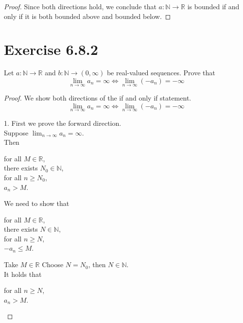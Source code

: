 \documentclass{article}
\newcommand{\N}{\mathbb{N}}
\newcommand{\R}{\mathbb{R}}
\theoremstyle{mytheoremstyle}
\theoremstyle{mytheoremstyle}
\theoremstyle{myproblemstyle}
\begin{document}
\begin{proof}
        Since both directions hold, we conclude that $a: \N \to \R$ is bounded if and only if it is both bounded above and bounded below.
    \end{proof}

    \section{Exercise 6.8.2}
    \begin{problem}
        Let $a: \N \to \R$ and $b: \N \to (0,\infty)$ be real-valued sequences. Prove that
        $$\lim_{n\to\infty}a_n = \infty \iff \lim_{n\to\infty}(-a_n) = -\infty$$
    \end{problem}
    \begin{proof}
        We show both directions of the if and only if statement.
        $$\lim_{n\to\infty}a_n = \infty \iff \lim_{n\to\infty}(-a_n) = -\infty$$

        1. First we prove the forward direction. \\
        Suppose $\lim_{n\to\infty}a_n = \infty$. \\
        Then
        \begin{center}
            \parbox{\linewidth}{
                \linewidth
                for all $M \in \R$, \\
                \hspace*{1em} there exists $N_0 \in \N$, \\
                \hspace*{2em} for all $n \geq N_0$, \\
                \hspace*{3em} $a_n > M$.
            }
        \end{center}
        We need to show that
        \begin{center}
            \parbox{\linewidth}{
                \linewidth
                for all $M \in \R$, \\
                \hspace*{1em} there exists $N \in \N$, \\
                \hspace*{2em} for all $n \geq N$, \\
                \hspace*{3em} $-a_n \leq M$.
            }
        \end{center}
        Take $M \in \R$
        Choose $N = N_0$, then $N \in \N$. \\
        It holds that
        \begin{center}
            \parbox{\linewidth}{
                \linewidth
                for all $n \geq N$, \\
                \hspace*{1em} $a_n > M$.
            }
        \end{center}
    \end{proof}
\end{document}
